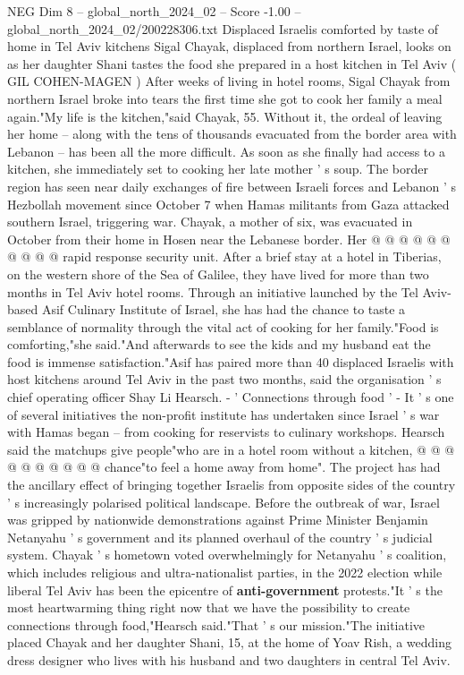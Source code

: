 \begin{textsample}{NEG Dim 8 – global\_north\_2024\_02 – Score -1.00 – global\_north\_2024\_02/200228306.txt}  \label{ex:f8_neg_234}
Displaced Israelis comforted by taste of home in Tel Aviv kitchens Sigal Chayak, displaced from northern Israel, looks on as her daughter Shani tastes the food she prepared in a host kitchen in Tel Aviv ( GIL COHEN-MAGEN ) After weeks of living in hotel rooms, Sigal Chayak from northern Israel broke into tears the first time she got to cook her family a meal again."My life is the kitchen,"said Chayak, 55.
Without it, the ordeal of leaving her home -- along with the tens of thousands evacuated from the border area with Lebanon -- has been all the more difficult.
As soon as she finally had access to a kitchen, she immediately set to cooking her late mother ' s soup.
The border region has seen near daily exchanges of fire between Israeli forces and Lebanon ' s Hezbollah movement since October 7 when Hamas militants from Gaza attacked southern Israel, triggering war.
Chayak, a mother of six, was evacuated in October from their home in Hosen near the Lebanese border.
Her @ @ @ @ @ @ @ @ @ @ rapid response security unit.
After a brief stay at a hotel in Tiberias, on the western shore of the Sea of Galilee, they have lived for more than two months in Tel Aviv hotel rooms.
Through an initiative launched by the Tel Aviv-based Asif Culinary Institute of Israel, she has had the chance to taste a semblance of normality through the vital act of cooking for her family."Food is comforting,"she said."And afterwards to see the kids and my husband eat the food is immense satisfaction."Asif has paired more than 40 displaced Israelis with host kitchens around Tel Aviv in the past two months, said the organisation ' s chief operating officer Shay Li Hearsch. - ' Connections through food ' - It ' s one of several initiatives the non-profit institute has undertaken since Israel ' s war with Hamas began -- from cooking for reservists to culinary workshops.
Hearsch said the matchups give people"who are in a hotel room without a kitchen, @ @ @ @ @ @ @ @ @ @ chance"to feel a home away from home".
The project has had the ancillary effect of bringing together Israelis from opposite sides of the country ' s increasingly polarised political landscape.
Before the outbreak of war, Israel was gripped by nationwide demonstrations against Prime Minister Benjamin Netanyahu ' s government and its planned overhaul of the country ' s judicial system.
Chayak ' s hometown voted overwhelmingly for Netanyahu ' s coalition, which includes religious and ultra-nationalist parties, in the 2022 election while liberal Tel Aviv has been the epicentre of \textbf{anti-government} protests."It ' s the most heartwarming thing right now that we have the possibility to create connections through food,"Hearsch said."That ' s our mission."The initiative placed Chayak and her daughter Shani, 15, at the home of Yoav Rish, a wedding dress designer who lives with his husband and two daughters in central Tel Aviv.

\end{textsample}
